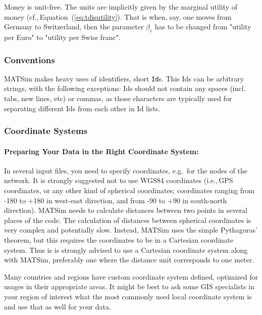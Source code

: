 Money is unit-free. The units are implicitly given by the marginal utility of money (cf.,\,Equation~(\ref{eq:tdisutility}). That is when, say, one moves from Germany to Switzerland, then the parameter $\beta_c$ has to be changed from "utility per Euro" to "utility per Swiss franc".

\subsubsection{Conventions}
MATSim makes heavy uses of identifiers, short \lstinline|Id|s. This Ids can be arbitrary strings, with the following exceptions: Ids should not contain any spaces (incl. tabs, new lines, etc) or commas, as those characters are typically used for separating different Ids from each other in Id lists. 

\subsubsection{Coordinate Systems}
\label{sec:coordinatesystems}
\paragraph{Preparing Your Data in the Right Coordinate System:}
In several input files, you need to specify coordinates, e.g.\ for the nodes of the network. It is strongly suggested not to use WGS84 coordinates (i.e.,\,GPS coordinates, or any other kind of spherical coordinates; coordinates ranging from -180 to +180 in west-east direction, and from -90 to +90 in south-north direction). MATSim needs to calculate distances between two points in several places of the code. The calculation of distances between spherical coordinates is very complex and potentially slow. Instead, MATSim uses the simple Pythagoras' theorem, but this requires the coordinates to be in a Cartesian coordinate system. Thus is is strongly advised to use a Cartesian coordinate system along with MATSim, preferably one where the distance unit corresponds to one meter.

Many countries and regions have custom coordinate system defined, optimized for usages in their appropriate areas. It might be best to ask some GIS specialists in your region of interest what the most commonly used local coordinate system is and use that as well for your data.

